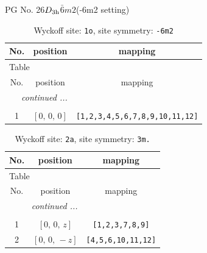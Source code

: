 \documentclass[fleqn,8pt]{jsarticle}
\begin{document}
\setcounter{MaxMatrixCols}{32}

\renewcommand{\tablename}{Table~}
\renewcommand{\figurename}{Figure~}
\begin{center}
\LARGE
PG No. 26\quad$D_{\rm 3h}$\quad$\bar{6}m2$\quad(-6m2 setting)\quad[ hexagonal ]
\end{center}
\renewcommand{\arraystretch}{1.2}
\begin{longtable}{ccc}
\caption{Wyckoff site: {\tt 1o}, site symmetry: {\tt -6m2}}
 \\
 \hline \hline
No. & position & mapping \\ \hline \endfirsthead

\multicolumn{2}{l}{\tablename\ \thetable{}} \\
 \hline \hline
No. & position & mapping \\ \hline \endhead

 \hline \hline
\multicolumn{2}{r}{\footnotesize\it continued ...} \\ \endfoot

 \hline \hline
\multicolumn{2}{r}{} \\ \endlastfoot

1 & $\left[ 0,\, 0,\, 0 \right]$ & {\tt [1,2,3,4,5,6,7,8,9,10,11,12]} \\
\end{longtable}
\renewcommand{\arraystretch}{1.2}
\begin{longtable}{ccc}
\caption{Wyckoff site: {\tt 2a}, site symmetry: {\tt 3m.}}
 \\
 \hline \hline
No. & position & mapping \\ \hline \endfirsthead

\multicolumn{2}{l}{\tablename\ \thetable{}} \\
 \hline \hline
No. & position & mapping \\ \hline \endhead

 \hline \hline
\multicolumn{2}{r}{\footnotesize\it continued ...} \\ \endfoot

 \hline \hline
\multicolumn{2}{r}{} \\ \endlastfoot

1 & $\left[ 0,\, 0,\, z \right]$ & {\tt [1,2,3,7,8,9]} \\ \hline
2 & $\left[ 0,\, 0,\, - z \right]$ & {\tt [4,5,6,10,11,12]} \\
\end{longtable}
\renewcommand{\arraystretch}{1.2}
\end{document}
